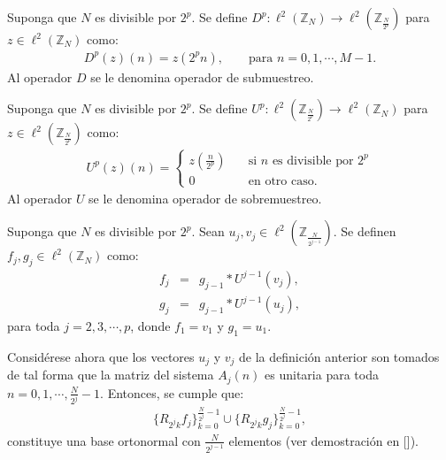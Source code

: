 \begin{definition}
Suponga que $N$ es divisible por $2^p$. Se define $D^p:\ell^2\left(\mathbb{Z}_N\right)\rightarrow \ell^2\left(\mathbb{Z}_{\frac{N}{2^p}}\right)$ para $z\in \ell^2\left(\mathbb{Z}_N\right)$ como:
\begin{eqnarray}
D^p(z)(n)=z(2^pn),\qquad\mbox{para $n=0,1,\cdots,M-1$.}\nonumber
\end{eqnarray}
Al operador $D$ se le denomina operador de submuestreo.
\end{definition}

\begin{definition}
Suponga que $N$ es divisible por $2^p$. Se define $U^p: \ell^2\left(\mathbb{Z}_{\frac{N}{2^p}}\right)\rightarrow \ell^2\left(\mathbb{Z}_N\right)$ para $z\in \ell^2\left(\mathbb{Z}_{\frac{N}{2^p}}\right)$ como:
\begin{eqnarray}
U^p(z)(n)=\left\{\begin{array}{ll}
z\left(\frac{n}{2^p}\right)&\quad\mbox{si $n$ es divisible por $2^p$}\\
0&\quad\mbox{en otro caso.}
\end{array}\right.\nonumber
\end{eqnarray}
Al operador $U$ se le denomina operador de sobremuestreo.
\end{definition}

\begin{definition}
Suponga que $N$ es divisible por $2^p$. Sean $u_j,v_j\in \ell^2\left(\mathbb{Z}_{\frac{N}{2^{j-1}}}\right)$. Se definen $f_j,g_j\in \ell^2\left(\mathbb{Z}_N\right)$ como:
\begin{eqnarray}
f_j&=&g_{j-1}\ast U^{j-1}(v_j),\nonumber\\
g_j&=&g_{j-1}\ast U^{j-1}(u_j),\nonumber
\end{eqnarray}
para toda $j=2,3,\cdots,p$, donde $f_1=v_1$ y $g_1=u_1$.
\end{definition}

\par Consid\'erese ahora que los vectores $u_j$ y $v_j$ de la definici\'on anterior son tomados de tal forma que la matriz del sistema $A_j(n)$ es unitaria para toda $n=0,1,\cdots,\frac{N}{2^j}-1$. Entonces, se cumple que:
\begin{eqnarray}
\{R_{2^jk}f_j\}_{k=0}^{\frac{N}{2^j}-1}\cup\{R_{2^jk}g_j\}_{k=0}^{\frac{N}{2^j}-1},\nonumber
\end{eqnarray}
constituye una base ortonormal con $\frac{N}{2^{j-1}}$ elementos (ver demostraci\'on en [\textcolor{cyan}{\cite{8}}]).

